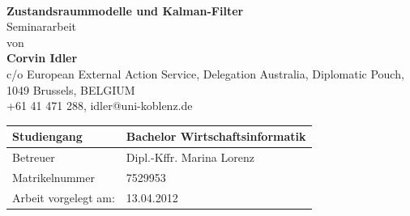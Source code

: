 \begin{titlepage}
\thispagestyle{empty}
 \begin{center}
 \begin{figure}[htbp]
    \centering
    \hspace{7.5em}
     \\
 \centering
  \vspace*{1.0cm}
\end{figure}

   



  \vspace*{2.5cm}
 {\bf \Large Zustandsraummodelle und Kalman-Filter}
 \vspace*{3.5cm} \\
 {\Large Seminararbeit\\von\\}
 \vspace{0.5cm}
 {\large \bfseries Corvin Idler\\}
c/o European External Action Service, Delegation Australia, Diplomatic Pouch, \\1049 Brussels, BELGIUM\\
 +61 41 471 288, idler@uni-koblenz.de
 \vfill



\begin{table}[h]
	\centering
	\begin{tabular}{|l| l|}\hline
		Studiengang & Bachelor Wirtschaftsinformatik\\ \hline
		Betreuer & Dipl.-Kffr. Marina Lorenz\\ \hline
		Matrikelnummer & 7529953\\ \hline
		Arbeit vorgelegt am: & 13.04.2012\\ \hline
	\end{tabular}
\end{table}

 \end{center}
\end{titlepage}